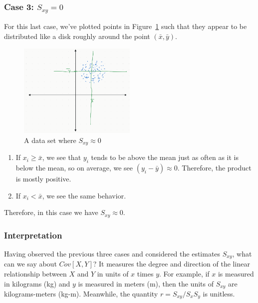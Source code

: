 \documentclass[12pt, a4paper]{article}
\theoremstyle{definition}
\begin{document}
	\subsubsection*{Case 3: $S_{xy} = 0$}
	For this last case, we've plotted points in Figure~\ref{fig:dataset-zero_{sxy}} such
	that they appear to be distributed like a disk roughly around the point $(\bar{x}, \bar{y})$.
	\begin{figure}
		\centering
		\includegraphics[width=0.5\textwidth]{zero-covariance-rvs}
		\caption{A data set where $S_{xy}\approx0$}
		\label{fig:dataset-zero_{sxy}}
	\end{figure}
	\begin{enumerate}[label=(\roman*)]
		\item If $x_i\geq \bar{x}$, we see that $y_i$ tends to be above the mean just
		as often as it is below the mean, so on average, we see $(y_i-\bar{y})\approx 0$.
		Therefore, the product is mostly positive.
		\item If $x_i < \bar{x}$, we see the same behavior.
	\end{enumerate}
	Therefore, in this case we have $S_{xy}\approx 0$.
	\subsubsection*{Interpretation}
	Having observed the previous three cases and considered the estimates $S_{xy}$,
	what can we say about $Cov[X, Y]$? It measures the degree and direction of the
	linear relationship between $X$ and $Y$ in units of $x$ times $y$. For example,
	if $x$ is measured in kilograms (kg) and $y$ is measured in meters (m), then
	the units of $S_{xy}$ are kilograms-meters (kg-m).
	Meanwhile, the quantity $r=S_{xy}/S_xS_y$ is unitless.
\end{document}
